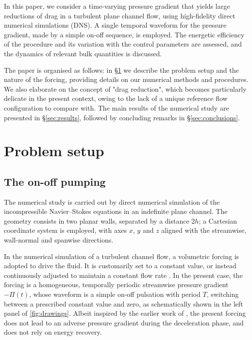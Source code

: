 \documentclass[lineno]{jfm}
\begin{document}
In this paper, we consider a time-varying pressure gradient that yields large reductions of drag in a turbulent plane channel flow, using high-fidelity direct numerical simulations (DNS).
A single temporal waveform for the pressure gradient, made by a simple on-off sequence, is employed. The energetic efficiency of the procedure and its variation with the control parameters are assessed, and the dynamics of relevant bulk quantities is discussed.

The paper is organised as follows: in \S\ref{sec:setup} we describe 
the problem setup and the nature of the forcing, providing 
details on our numerical methods and procedures. 
We also elaborate on the concept of "drag reduction", 
which becomes particularly delicate in the present context, owing to the lack of a unique reference flow configuration to compare with.
The main results of the numerical study are presented in \S\ref{sec:results}, followed by concluding remarks in \S\ref{sec:conclusions}. 

\section{Problem setup}
\label{sec:setup}

\subsection{The on-off pumping}
The numerical study is carried out by direct numerical simulation of  
the incompressible Navier--Stokes equations in an indefinite plane channel. The geometry consists in two planar walls, separated by a distance $2h$; a Cartesian coordinate system is employed, with axes $x$, $y$ and $z$ aligned with the streamwise, wall-normal and spanwise directions. 

In the numerical simulation of a turbulent channel flow, a volumetric forcing is 
adopted to drive the fluid. It is customarily set to a constant value, or instead continuously adjusted to maintain a constant flow rate \citep{quadrio-frohnapfel-hasegawa-2016}.
In the present case, the forcing is a homogeneous, temporally periodic 
streamwise pressure gradient $-\Pi(t)$, whose waveform is a simple on-off pulsation 
with period $T$, switching between a prescribed constant value and zero, as 
schematically shown in the left panel of \cref{fig:drawings}.
Albeit inspired by the earlier work of \citet{iwamoto-sasou-kawamura-2007}, the present forcing does not lead to an adverse pressure gradient during the deceleration phase, and does not rely on energy recovery.
\end{document}
